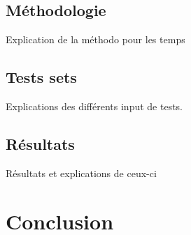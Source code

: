 \documentclass[12pt,a4paper]{article}
\begin{document}
\subsection{Méthodologie}%
\label{subsec:methodo}
Explication de la méthodo pour les temps

\subsection{Tests sets}%
\label{subsec:sets}

Explications des différents input de tests.

\subsection{Résultats}%
\label{subsec:res}

Résultats et explications de ceux-ci

\section{Conclusion}




\end{document}
